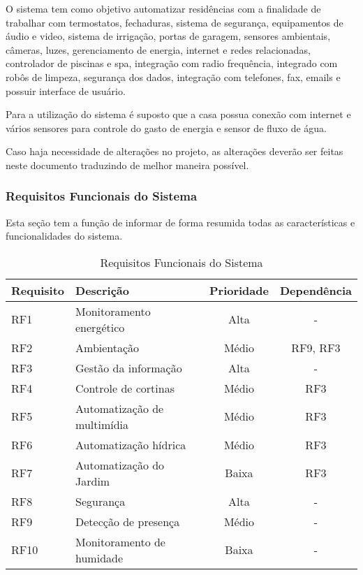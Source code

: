 
	O sistema tem como objetivo automatizar residências com a finalidade de trabalhar com termostatos, fechaduras,
	sistema de segurança, equipamentos de áudio e video, sistema de irrigação, portas de garagem, sensores ambientais,
	 câmeras, luzes, gerenciamento de energia, internet e redes relacionadas, controlador de piscinas e spa, integração
	  com radio frequência, integrado com robôs de limpeza, segurança dos dados, integração com telefones, fax, emails
	    e possuir interface de usuário.


	Para a utilização do sistema é suposto que a casa possua conexão com internet e vários sensores para controle do
	gasto de energia e sensor de fluxo de água.

	Caso haja necessidade de alterações no projeto, as alterações deverão ser feitas neste documento traduzindo de
	melhor maneira possível.

\subsubsection{Requisitos Funcionais do Sistema}

	Esta seção tem a função de informar de forma resumida todas as características e funcionalidades do sistema.

\begin{table}[H]
\begin{tabular}{|l|l|c|c|}
	\hline
	\textbf{Requisito} & \textbf{Descrição} & \textbf{Prioridade} & \textbf{Dependência}\tabularnewline
	\hline
	\hline
	RF1 & Monitoramento energético & Alta & -\tabularnewline
	\hline
	RF2 & Ambientação & Médio & RF9, RF3\tabularnewline
	\hline
	RF3 & Gestão da informação & Alta & -\tabularnewline
	\hline
	RF4 & Controle de cortinas & Médio & RF3\tabularnewline
	\hline
	RF5 & Automatização de multimídia & Médio & RF3\tabularnewline
	\hline
	RF6 & Automatização hídrica & Médio & RF3\tabularnewline
	\hline
	RF7 & Automatização do Jardim & Baixa & RF3\tabularnewline
	\hline
	RF8 & Segurança & Alta & -\tabularnewline
	\hline
	RF9 & Detecção de presença & Médio & -\tabularnewline
	\hline
	RF10 & Monitoramento de humidade & Baixa & -\tabularnewline
	\hline
\end{tabular}
\caption{Requisitos Funcionais do Sistema}
\label{Requisitos_Funcionais_do_Sistema}
\end{table}

